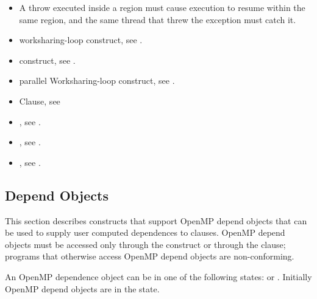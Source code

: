 \begin{cppspecific}
\begin{itemize}
\item A throw executed inside a  region must cause execution to
resume within the same  region, and the same thread that threw
the exception must catch it.
\end{itemize}
\end{cppspecific}



\crossreferences
\begin{itemize}
\item worksharing-loop construct, see
.

\item {} construct, see
.

\item parallel Worksharing-loop construct, see
.

\item {} Clause, see

\item {}, see
.

\item {}, see
.

\item {}, see
.

\end{itemize}

\subsection{Depend Objects}
\label{subsec:Depend Object}

This section describes constructs that support OpenMP depend objects that can be used to supply user computed dependences to  clauses. OpenMP depend objects must be accessed only through the  construct or through the  clause; programs that otherwise access OpenMP depend objects are non-conforming.

An OpenMP dependence object can be in one of the following states:  or . Initially OpenMP depend objects are in the  state.

